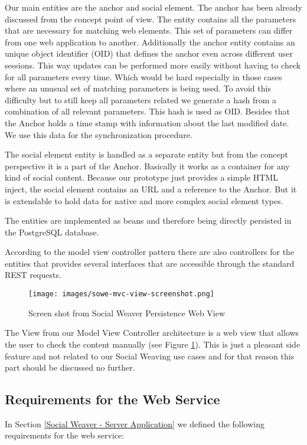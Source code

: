Our main entities are the anchor and social element. The anchor has been already discussed from the concept point of view. The entity contains all the parameters that are necessary for matching web elements. This set of parameters can differ from one web application to another. Additionally the anchor entity contains an unique object identifier (OID) that defines the anchor even across different user sessions. This way updates can be performed more easily without having to check for all parameters every time. Which would be hard especially in those cases where an unusual set of matching parameters is being used. To avoid this difficulty but to still keep all parameters related we generate a hash from a combination of all relevant parameters. This hash is used as OID. 
Besides that the Anchor holds a time stamp with information about the last modified date. We use this data for the synchronization procedure. 

The social element entity is handled as a separate entity but from the concept perspective it is a part of the Anchor. Basically it works as a container for any kind of social content. Because our prototype just provides a simple HTML inject, the social element contains an URL and a reference to the Anchor. But it is extendable to hold data for native and more complex social element types. 

The entities are implemented as beans and therefore being directly persisted in the PostgreSQL database.

According to the model view controller pattern there are also controllers for the entities that provides several interfaces that are accessible through the standard REST requests. 

\begin{figure}\centering
		\texttt{[image: images/sowe-mvc-view-screenshot.png]}
		\caption{Screen shot from Social Weaver Persistence Web View}
		\label{sowe-mvc-view-screenshot}
\end{figure} 

The View from our Model View Controller architecture is a web view that allows the user to check the content manually (see Figure \ref{sowe-mvc-view-screenshot}). This is just a pleasant side feature and not related to our Social Weaving use cases and for that reason this part should be discussed no further.

\newpage
\subsection{Requirements for the Web Service}
In Section \ref{Social Weaver - Server Application} we defined the following requirements for the web service:

